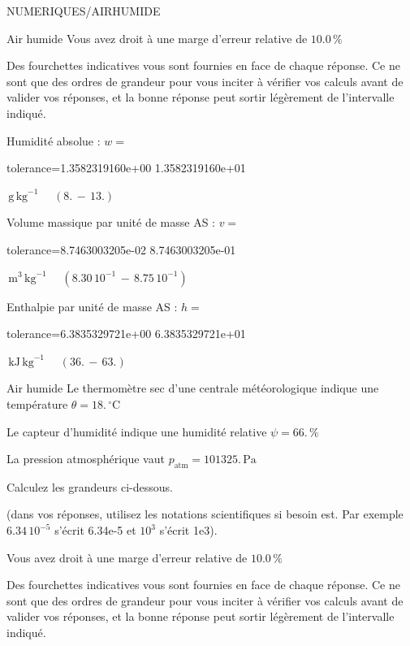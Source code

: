\documentclass[12pt]{article}
\begin{document}
\begin{quiz}{NUMERIQUES/AIRHUMIDE}
\begin{cloze}{Air humide}
Vous avez droit à une marge d'erreur relative de $10.0\, \% $

Des fourchettes indicatives vous sont fournies en face de chaque réponse. Ce ne sont que des ordres de grandeur pour vous inciter à vérifier vos calculs avant de valider vos réponses, et la bonne réponse peut sortir légèrement de l'intervalle indiqué.

Humidité absolue : $w =  $
\begin{numerical}[points=1] 
\item[tolerance={1.3582319160e+00}] 1.3582319160e+01 
\end{numerical} 
 $\,  \mathrm{g}\,  \mathrm{kg}^{-1}$ 
 $ \quad (8. \, - \, 13.) $ 

Volume massique par unité de masse AS : $v =  $
\begin{numerical}[points=1] 
\item[tolerance={8.7463003205e-02}] 8.7463003205e-01 
\end{numerical} 
 $\,  \mathrm{m}^{3}\,  \mathrm{kg}^{-1}$ 
 $ \quad ( 8.30 \, 10^{-1}  \, - \,  8.75 \, 10^{-1} ) $ 

Enthalpie par unité de masse AS : $h =  $
\begin{numerical}[points=2] 
\item[tolerance={6.3835329721e+00}] 6.3835329721e+01 
\end{numerical} 
 $\,  \mathrm{kJ}\,  \mathrm{kg}^{-1}$ 
 $ \quad (36. \, - \, 63.) $ 

\end{cloze} 


 \begin{cloze}{Air humide} 
Le thermomètre sec d’une centrale météorologique indique une température $\theta = 18.\,  \mathrm{^\circ\mathrm{C}} $

Le capteur d'humidité indique une humidité relative $\psi = 66.\, \% $

La pression atmosphérique vaut $p_{\text{atm}} = 101325.\,  \mathrm{Pa} $

 

Calculez les grandeurs ci-dessous.

(dans vos réponses, utilisez les notations scientifiques si besoin est. Par exemple $6.34\, 10^{-5}$ s'écrit 6.34e-5 et $10^{3}$ s'écrit 1e3).

Vous avez droit à une marge d'erreur relative de $10.0\, \% $

Des fourchettes indicatives vous sont fournies en face de chaque réponse. Ce ne sont que des ordres de grandeur pour vous inciter à vérifier vos calculs avant de valider vos réponses, et la bonne réponse peut sortir légèrement de l'intervalle indiqué.


\end{cloze}
\end{quiz}
\end{document}
